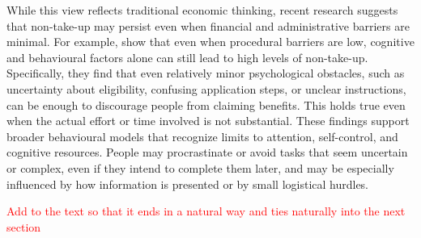 While this view reflects traditional economic thinking, recent research suggests that non-take-up may persist even when financial and administrative barriers are minimal. For example, \cite{bhargava_psychological_2015} show that even when procedural barriers are low, cognitive and behavioural factors alone can still lead to high levels of non-take-up. Specifically, they find that even relatively minor psychological obstacles, such as uncertainty about eligibility, confusing application steps, or unclear instructions, can be enough to discourage people from claiming benefits. This holds true even when the actual effort or time involved is not substantial. These findings support broader behavioural models that recognize limits to attention, self-control, and cognitive resources. People may procrastinate or avoid tasks that seem uncertain or complex, even if they intend to complete them later, and may be especially influenced by how information is presented or by small logistical hurdles.

\textcolor{red}{Add to the text so that it ends in a natural way and ties naturally into the next section}

